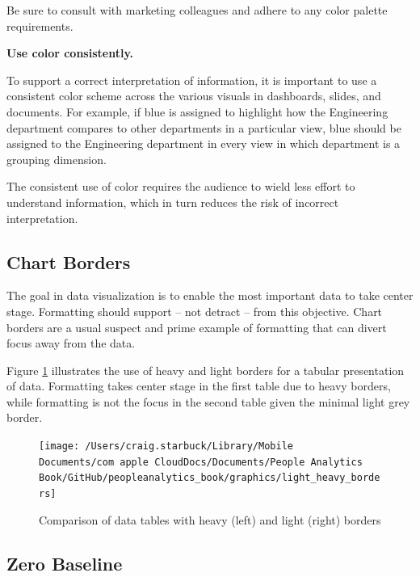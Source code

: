 \documentclass[
]{book}
\begin{document}
Be sure to consult with marketing colleagues and adhere to any color palette requirements.

\textbf{Use color consistently.}

To support a correct interpretation of information, it is important to use a consistent color scheme across the various visuals in dashboards, slides, and documents. For example, if blue is assigned to highlight how the Engineering department compares to other departments in a particular view, blue should be assigned to the Engineering department in every view in which department is a grouping dimension.

The consistent use of color requires the audience to wield less effort to understand information, which in turn reduces the risk of incorrect interpretation.

\hypertarget{chart-borders}{%
\subsection{Chart Borders}\label{chart-borders}}

The goal in data visualization is to enable the most important data to take center stage. Formatting should support -- not detract -- from this objective. Chart borders are a usual suspect and prime example of formatting that can divert focus away from the data.

Figure \ref{fig:chart-borders} illustrates the use of heavy and light borders for a tabular presentation of data. Formatting takes center stage in the first table due to heavy borders, while formatting is not the focus in the second table given the minimal light grey border.

\begin{figure}

{\centering \texttt{[image: /Users/craig.starbuck/Library/Mobile Documents/com~apple~CloudDocs/Documents/People Analytics Book/GitHub/peopleanalytics\_book/graphics/light\_heavy\_borders]} 

}

\caption{Comparison of data tables with heavy (left) and light (right) borders}\label{fig:chart-borders}
\end{figure}

\hypertarget{zero-baseline}{%
\subsection{Zero Baseline}\label{zero-baseline}}
\end{document}
